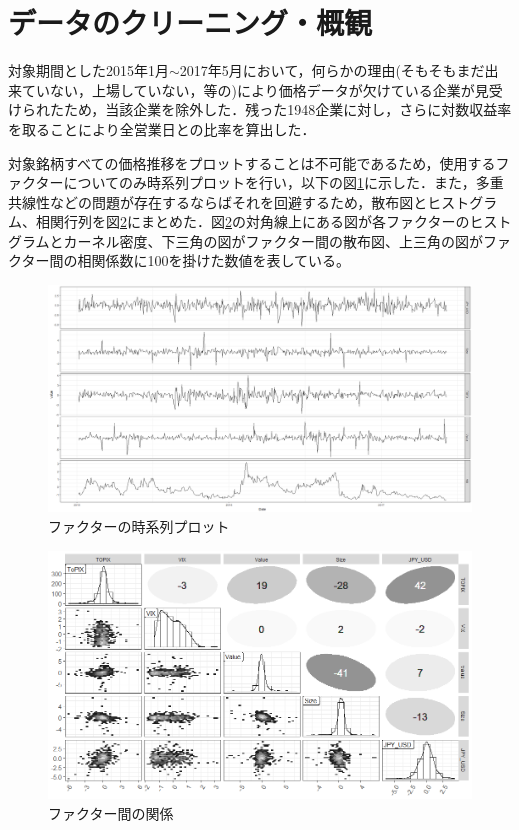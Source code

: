 \documentclass[11pt]{jreport}
\begin{document}
\section{データのクリーニング・概観}
対象期間とした2015年1月$\sim$2017年5月において，何らかの理由(そもそもまだ出来ていない，上場していない，等の)により価格データが欠けている企業が見受けられたため，当該企業を除外した．残った1948企業に対し，さらに対数収益率を取ることにより全営業日との比率を算出した．

対象銘柄すべての価格推移をプロットすることは不可能であるため，使用するファクターについてのみ時系列プロットを行い，以下の図\ref{fig:factor_plot}に示した．また，多重共線性などの問題が存在するならばそれを回避するため，散布図とヒストグラム、相関行列を図\ref{fig:factor_cor}にまとめた．図\ref{fig:factor_cor}の対角線上にある図が各ファクターのヒストグラムとカーネル密度、下三角の図がファクター間の散布図、上三角の図がファクター間の相関係数に100を掛けた数値を表している。

\begin{figure}[H]
	\begin{center}
		\includegraphics[width=15cm]{./fig/factor_plot.png}
		\caption{ファクターの時系列プロット}
		\label{fig:factor_plot}
	\end{center}
\end{figure}

\begin{figure}[H]
	\begin{center}
		\includegraphics[width=15cm]{./fig/factor_cor.png}
		\caption{ファクター間の関係}
		\label{fig:factor_cor}
	\end{center}
\end{figure}
\end{document}
